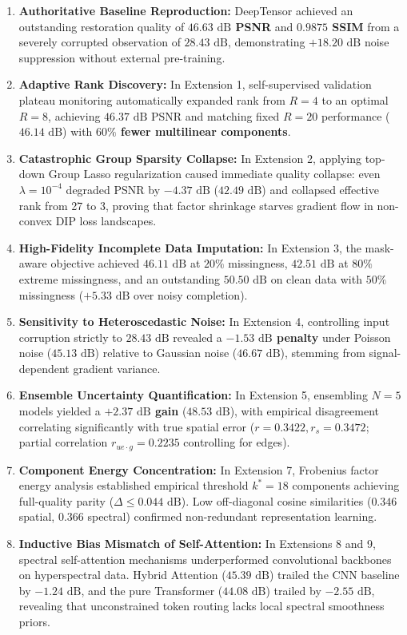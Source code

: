 \begin{enumerate}
    \item \textbf{Authoritative Baseline Reproduction:} DeepTensor achieved an outstanding restoration quality of \textbf{$46.63\text{ dB}$ PSNR} and \textbf{$0.9875$ SSIM} from a severely corrupted observation of $28.43\text{ dB}$, demonstrating $+18.20\text{ dB}$ noise suppression without external pre-training.
    \item \textbf{Adaptive Rank Discovery:} In Extension 1, self-supervised validation plateau monitoring automatically expanded rank from $R=4$ to an optimal \textbf{$R=8$}, achieving $46.37\text{ dB}$ PSNR and matching fixed $R=20$ performance ($46.14\text{ dB}$) with \textbf{$60\%$ fewer multilinear components}.
    \item \textbf{Catastrophic Group Sparsity Collapse:} In Extension 2, applying top-down Group Lasso regularization caused immediate quality collapse: even $\lambda = 10^{-4}$ degraded PSNR by $-4.37\text{ dB}$ ($42.49\text{ dB}$) and collapsed effective rank from 27 to 3, proving that factor shrinkage starves gradient flow in non-convex DIP loss landscapes.
    \item \textbf{High-Fidelity Incomplete Data Imputation:} In Extension 3, the mask-aware objective achieved $46.11\text{ dB}$ at $20\%$ missingness, $42.51\text{ dB}$ at $80\%$ extreme missingness, and an outstanding \textbf{$50.50\text{ dB}$} on clean data with $50\%$ missingness ($+5.33\text{ dB}$ over noisy completion).
    \item \textbf{Sensitivity to Heteroscedastic Noise:} In Extension 4, controlling input corruption strictly to $28.43\text{ dB}$ revealed a \textbf{$-1.53\text{ dB}$ penalty} under Poisson noise ($45.13\text{ dB}$) relative to Gaussian noise ($46.67\text{ dB}$), stemming from signal-dependent gradient variance.
    \item \textbf{Ensemble Uncertainty Quantification:} In Extension 5, ensembling $N=5$ models yielded a \textbf{$+2.37\text{ dB}$ gain} ($48.53\text{ dB}$), with empirical disagreement correlating significantly with true spatial error ($r = 0.3422, r_s = 0.3472$; partial correlation $r_{ue \cdot g} = 0.2235$ controlling for edges).
    \item \textbf{Component Energy Concentration:} In Extension 7, Frobenius factor energy analysis established empirical threshold \textbf{$k^* = 18$} components achieving full-quality parity ($\Delta \le 0.044\text{ dB}$). Low off-diagonal cosine similarities ($0.346$ spatial, $0.366$ spectral) confirmed non-redundant representation learning.
    \item \textbf{Inductive Bias Mismatch of Self-Attention:} In Extensions 8 and 9, spectral self-attention mechanisms underperformed convolutional backbones on hyperspectral data. Hybrid Attention ($45.39\text{ dB}$) trailed the CNN baseline by \textbf{$-1.24\text{ dB}$}, and the pure Transformer ($44.08\text{ dB}$) trailed by \textbf{$-2.55\text{ dB}$}, revealing that unconstrained token routing lacks local spectral smoothness priors.
\end{enumerate}

